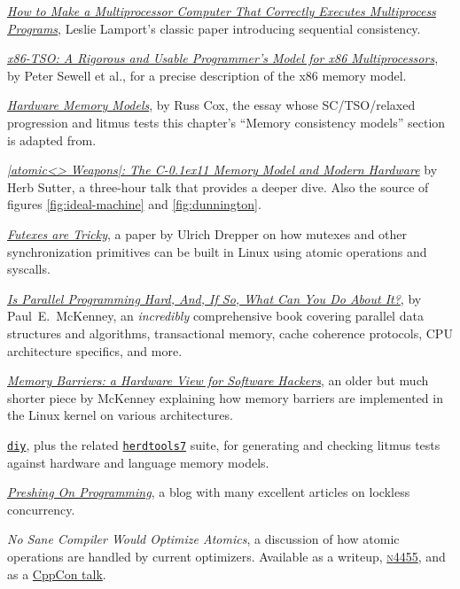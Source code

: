 \documentclass[fontsize=10pt, oneside]{scrartcl}
\newcommand{\cplusplus}[1]{C\kern-0.1ex\raisebox{0.15ex}{\texttt{++}}#1}
\begin{document}
\href{https://lamport.azurewebsites.net/pubs/multi.pdf}{%
\textit{How to Make a Multiprocessor Computer That Correctly Executes Multiprocess Programs}},
Leslie Lamport's classic paper introducing sequential consistency.

\href{https://www.cl.cam.ac.uk/~pes20/weakmemory/cacm.pdf}{%
\textit{x86-TSO: A Rigorous and Usable Programmer's Model for x86 Multiprocessors}},
by Peter Sewell et al.,
for a precise description of the x86 memory model.

\href{https://research.swtch.com/hwmm}{%
\textit{Hardware Memory Models}},
by Russ Cox,
the essay whose SC/TSO/relaxed progression and litmus tests this chapter's
``Memory consistency models'' section is adapted from.

\href{https://herbsutter.com/2013/02/11/atomic-weapons-the-c-memory-model-and-modern-hardware/}{%
\textit{\cpp|atomic<> Weapons|: The \cplusplus{11} Memory Model and Modern Hardware}}
by Herb Sutter,
a three-hour talk that provides a deeper dive.
Also the source of figures \ref{fig:ideal-machine} and \ref{fig:dunnington}.

\href{https://www.akkadia.org/drepper/futex.pdf}{\textit{Futexes are Tricky}},
a paper by Ulrich Drepper on how mutexes and other synchronization primitives can be built in Linux using atomic operations and syscalls.

\href{https://www.kernel.org/pub/linux/kernel/people/paulmck/perfbook/perfbook.html}{%
\textit{Is Parallel Programming Hard, And, If So, What Can You Do About It?}},
by Paul~E.\ McKenney,
an \emph{incredibly} comprehensive book covering parallel data structures and
algorithms, transactional memory, cache coherence protocols,
\textsc{CPU} architecture specifics, and more.

\href{http://www.rdrop.com/~paulmck/scalability/paper/whymb.2010.06.07c.pdf}{%
\textit{Memory Barriers: a Hardware View for Software Hackers}},
an older but much shorter piece by McKenney explaining how memory barriers are implemented
in the Linux kernel on various architectures.

\href{https://diy.inria.fr/}{\texttt{diy}},
plus the related
\href{https://github.com/herd/herdtools7}{\texttt{herdtools7}} suite,
for generating and checking litmus tests against hardware and language memory models.

\href{https://preshing.com/archives/}{\textit{Preshing On Programming}},
a blog with many excellent articles on lockless concurrency.

\textit{No Sane Compiler Would Optimize Atomics},
a discussion of how atomic operations are handled by current optimizers.
Available as a writeup,
\href{http://www.open-std.org/jtc1/sc22/wg21/docs/papers/2015/n4455.html}{%
\textsc{n}4455}, and as a
\href{https://www.youtube.com/watch?v=IB57wIf9W1k}{CppCon talk}.
\end{document}
